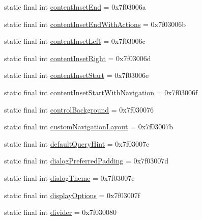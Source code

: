 \begin{DoxyCompactItemize}
\item 
static final int \mbox{\hyperlink{classandroid_1_1support_1_1v7_1_1appcompat_1_1R_1_1attr_ab71363df2b03d4f30e3d536a00a2ca6d}{content\+Inset\+End}} = 0x7f03006a
\item 
static final int \mbox{\hyperlink{classandroid_1_1support_1_1v7_1_1appcompat_1_1R_1_1attr_a8bc41dc209147c932fd433349fd68696}{content\+Inset\+End\+With\+Actions}} = 0x7f03006b
\item 
static final int \mbox{\hyperlink{classandroid_1_1support_1_1v7_1_1appcompat_1_1R_1_1attr_aaf2a29e66c8a42789b673d462773925e}{content\+Inset\+Left}} = 0x7f03006c
\item 
static final int \mbox{\hyperlink{classandroid_1_1support_1_1v7_1_1appcompat_1_1R_1_1attr_a94b4a9274ac6846ced1bf48134b9d949}{content\+Inset\+Right}} = 0x7f03006d
\item 
static final int \mbox{\hyperlink{classandroid_1_1support_1_1v7_1_1appcompat_1_1R_1_1attr_a61dc3ecd604789f327e116a47a14eb48}{content\+Inset\+Start}} = 0x7f03006e
\item 
static final int \mbox{\hyperlink{classandroid_1_1support_1_1v7_1_1appcompat_1_1R_1_1attr_aec0ee8896f70725491d6040521980ec9}{content\+Inset\+Start\+With\+Navigation}} = 0x7f03006f
\item 
static final int \mbox{\hyperlink{classandroid_1_1support_1_1v7_1_1appcompat_1_1R_1_1attr_a45487fed6103ea5d91fe539fb516567f}{control\+Background}} = 0x7f030076
\item 
static final int \mbox{\hyperlink{classandroid_1_1support_1_1v7_1_1appcompat_1_1R_1_1attr_ab2e6c054c8f5ae06a6e87cc02953c64c}{custom\+Navigation\+Layout}} = 0x7f03007b
\item 
static final int \mbox{\hyperlink{classandroid_1_1support_1_1v7_1_1appcompat_1_1R_1_1attr_ae3cf4d27d2e9b11002adc082eb60c299}{default\+Query\+Hint}} = 0x7f03007c
\item 
static final int \mbox{\hyperlink{classandroid_1_1support_1_1v7_1_1appcompat_1_1R_1_1attr_ad396f5e8162c9e55d0327928cc7fa536}{dialog\+Preferred\+Padding}} = 0x7f03007d
\item 
static final int \mbox{\hyperlink{classandroid_1_1support_1_1v7_1_1appcompat_1_1R_1_1attr_ab19486b0733aa673ad9200e26d9d75ff}{dialog\+Theme}} = 0x7f03007e
\item 
static final int \mbox{\hyperlink{classandroid_1_1support_1_1v7_1_1appcompat_1_1R_1_1attr_a34a85afaf262f746407000a5e07dd1bf}{display\+Options}} = 0x7f03007f
\item 
static final int \mbox{\hyperlink{classandroid_1_1support_1_1v7_1_1appcompat_1_1R_1_1attr_ab828acf2ffc5acfe50ab18caeabbb5dd}{divider}} = 0x7f030080

\end{DoxyCompactItemize}
